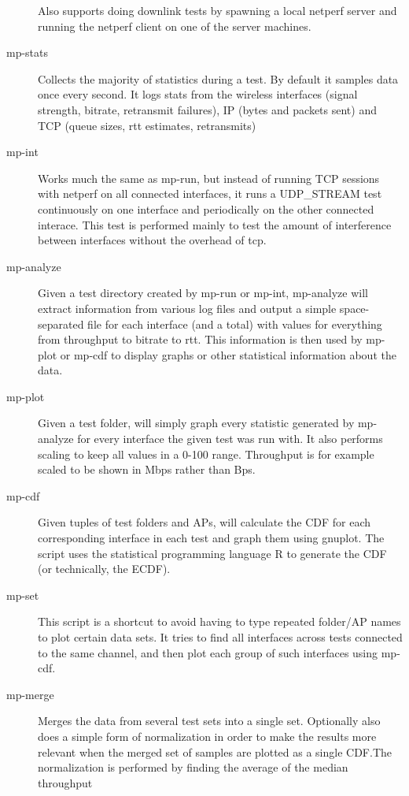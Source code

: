 \documentclass[12pt,a4paper]{article}
\begin{document}
\begin{description}
    Also supports doing downlink tests by spawning a local netperf server and
    running the netperf client on one of the server machines.
  \item[mp-stats]
    Collects the majority of statistics during a test. By default it samples
    data once every second. It logs stats from the wireless interfaces (signal
    strength, bitrate, retransmit failures), IP (bytes and packets sent) and TCP
    (queue sizes, rtt estimates, retransmits)
  \item[mp-int]
    Works much the same as mp-run, but instead of running TCP sessions with
    netperf on all connected interfaces, it runs a UDP\_STREAM test continuously
    on one interface and periodically on the other connected interace. This test
    is performed mainly to test the amount of interference between interfaces
    without the overhead of tcp.
  \item[mp-analyze]
    Given a test directory created by mp-run or mp-int, mp-analyze will extract
    information from various log files and output a simple space-separated file
    for each interface (and a total) with values for everything from throughput
    to bitrate to rtt. This information is then used by mp-plot or mp-cdf to
    display graphs or other statistical information about the data.
  \item[mp-plot]
    Given a test folder, will simply graph every statistic generated by
    mp-analyze for every interface the given test was run with. It also performs
    scaling to keep all values in a 0-100 range. Throughput is for example
    scaled to be shown in Mbps rather than Bps.
  \item[mp-cdf]
    Given tuples of test folders and APs, will calculate the CDF for each
    corresponding interface in each test and graph them using gnuplot. The
    script uses the statistical programming language R to generate the CDF (or
    technically, the ECDF).
  \item[mp-set]
    This script is a shortcut to avoid having to type repeated folder/AP
    names to plot certain data sets. It tries to find all interfaces across
    tests connected to the same channel, and then plot each group of such
    interfaces using mp-cdf.
  \item[mp-merge]
    Merges the data from several test sets into a single set. Optionally also
    does a simple form of normalization in order to make the results more
    relevant when the merged set of samples are plotted as a single CDF.\@ The
    normalization is performed by finding the average of the median throughput

\end{description}
\end{document}
